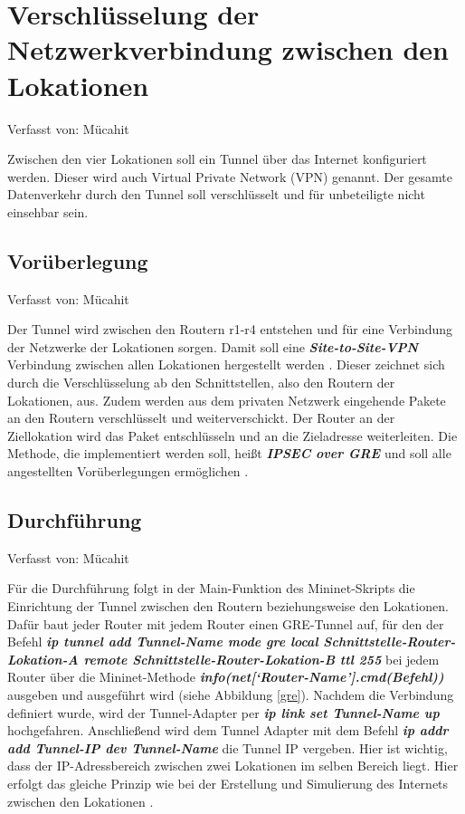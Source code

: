 \documentclass[fontsize=12pt,paper=a4,open=any,parskip=half,
  twoside=false,toc=listof,toc=bibliography,fleqn,leqno,
  captions=nooneline,captions=tableabove,british]{scrbook}
\begin{document}
\newpage
\section{Verschlüsselung der Netzwerkverbindung zwischen den Lokationen}
{\tiny Verfasst von: Mücahit\par}
Zwischen den vier Lokationen soll ein Tunnel über das Internet konfiguriert werden. Dieser wird auch Virtual Private Network (VPN) genannt. Der gesamte Datenverkehr durch den Tunnel soll verschlüsselt und für unbeteiligte nicht einsehbar sein.

\subsection{Vorüberlegung}
{\tiny Verfasst von: Mücahit\par}
Der Tunnel wird zwischen den Routern r1-r4 entstehen und für eine Verbindung der Netzwerke der Lokationen sorgen. Damit soll eine \textit{\textbf{Site-to-Site-VPN}} Verbindung zwischen allen Lokationen hergestellt werden \cite{sitetosite}. Dieser zeichnet sich durch die Verschlüsselung ab den Schnittstellen, also den Routern der Lokationen, aus. Zudem werden aus dem privaten Netzwerk eingehende Pakete an den Routern verschlüsselt und weiterverschickt. Der Router an der Ziellokation wird das Paket entschlüsseln und an die Zieladresse weiterleiten. Die Methode, die implementiert werden soll, heißt \textit{\textbf{IPSEC over GRE}} und soll alle angestellten Vorüberlegungen ermöglichen \cite{vpntunnel}.

\subsection{Durchführung}
{\tiny Verfasst von: Mücahit\par}
Für die Durchführung folgt in der Main-Funktion des Mininet-Skripts die Einrichtung der Tunnel zwischen den Routern beziehungsweise den Lokationen. Dafür baut jeder Router mit jedem Router einen GRE-Tunnel auf, für den der Befehl \textit{\textbf{ip tunnel add Tunnel-Name mode gre local Schnittstelle\hyp{}Router\hyp{}Lokation\hyp{}A remote Schnittstelle\hyp{}Router\hyp{}Lokation\hyp{}B ttl 255}} bei jedem Router über die Mininet-Methode \textit{\textbf{info(net[‘Router\hyp{}Name'].cmd(Befehl))}} ausgeben und ausgeführt wird (siehe Abbildung \ref{gre}). Nachdem die Verbindung definiert wurde, wird der Tunnel-Adapter per \textit{\textbf{ip link set Tunnel-Name up}} hochgefahren. Anschließend wird dem Tunnel Adapter mit dem Befehl \textit{\textbf{ip addr add Tunnel-IP dev Tunnel-Name}} die Tunnel IP vergeben. Hier ist wichtig, dass der IP-Adressbereich zwischen zwei Lokationen im selben Bereich liegt. Hier erfolgt das gleiche Prinzip wie bei der Erstellung und Simulierung des Internets zwischen den Lokationen \cite{tunnelimpl}.
\end{document}
